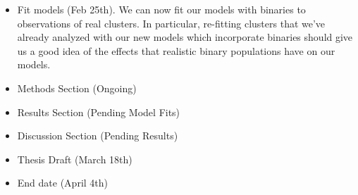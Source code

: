 \documentclass[12pt,letterpaper]{article}
\begin{document}
\begin{itemize}
	\item Fit models (Feb 25th). We can now fit our models with binaries to observations of real
	      clusters. In particular, re-fitting clusters that we've already analyzed with our new
	      models which incorporate binaries should give us a good idea of the effects that
	      realistic binary populations have on our models.
	\item Methods Section (Ongoing)
	\item Results Section (Pending Model Fits)
	\item Discussion Section (Pending Results)
	\item Thesis Draft (March 18th)
	\item End date (April 4th)
\end{itemize}
\end{document}
